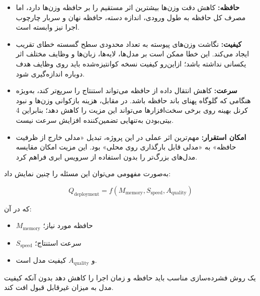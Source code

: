 \begin{itemize}

    \item
    \textbf{حافظه:}
    کاهش دقت وزن‌ها بیشترین اثر مستقیم را بر حافظه وزن‌ها دارد،
    اما مصرف کل حافظه به طول ورودی، اندازه دسته، حافظه نهان 
    و سربار چارچوب اجرا نیز وابسته است.

    \item
    \textbf{کیفیت:}
    نگاشت وزن‌های پیوسته به تعداد محدودی سطح گسسته خطای تقریب ایجاد
    می‌کند. این خطا ممکن است بر مدل‌ها، لایه‌ها، زبان‌ها و وظایف
    مختلف اثر یکسانی نداشته باشد؛ ازاین‌رو کیفیت نسخه کوانتیزه‌شده
    باید روی وظایف هدف دوباره اندازه‌گیری شود.

    \item
    \textbf{سرعت:}
    کاهش انتقال داده از حافظه می‌تواند استنتاج را سریع‌تر کند،
    به‌ویژه هنگامی که گلوگاه پهنای باند حافظه باشد. در مقابل، هزینه
    بازکوانی وزن‌ها و نبود کرنل بهینه روی برخی سخت‌افزارها می‌تواند
    این مزیت را کاهش دهد؛ بنابراین 4 بیتی‌بودن به‌تنهایی تضمین‌کننده
    افزایش سرعت نیست.

    \item
    \textbf{امکان استقرار:}
    مهم‌ترین اثر عملی در این پروژه، تبدیل «مدلی خارج از ظرفیت حافظه»
    به «مدلی قابل بارگذاری روی  محلی» بود. این مزیت امکان
    مقایسه مدل‌های بزرگ‌تر را بدون استفاده از سرویس ابری فراهم کرد.

\end{itemize}

به‌صورت مفهومی می‌توان این مسئله را چنین نمایش داد:

\begin{equation}
Q_{\mathrm{deployment}}
=
f(
M_{\mathrm{memory}},
S_{\mathrm{speed}},
A_{\mathrm{quality}}
)
\end{equation}

که در آن:

\begin{itemize}

    \item $M_{\mathrm{memory}}$ حافظه مورد نیاز؛

    \item $S_{\mathrm{speed}}$ سرعت استنتاج؛

    \item و $A_{\mathrm{quality}}$ کیفیت مدل است.

\end{itemize}

یک روش فشرده‌سازی مناسب باید حافظه و زمان اجرا را کاهش دهد
بدون آنکه کیفیت مدل به میزان غیرقابل قبول افت کند.

